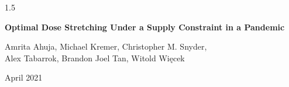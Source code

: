 \documentclass[12pt]{article}
\begin{document}
\begin{spacing}{1.5}

\begin{titlepage}
\singlespace

\begin{center}
{\bf Optimal Dose Stretching Under a Supply Constraint in a Pandemic}
\end{center}

\begin{center}
Amrita  Ahuja, Michael Kremer, Christopher M. Snyder,\\
Alex Tabarrok, Brandon Joel Tan, Witold Więcek
\end{center}

\begin{center}
April 2021
\end{center}


\end{titlepage}
\end{spacing}
\end{document}
